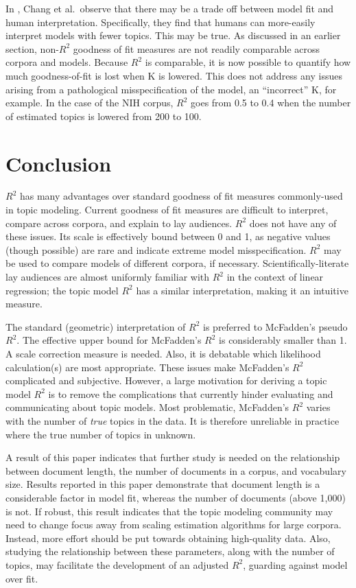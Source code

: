 \documentclass[conference,final,]{IEEEtran}
\begin{document}
In \cite{chang09}, Chang et al.~observe that there may be a trade off
between model fit and human interpretation. Specifically, they find that
humans can more-easily interpret models with fewer topics. This may be
true. As discussed in an earlier section, non-\(R^2\) goodness of fit
measures are not readily comparable across corpora and models. Because
\(R^2\) is comparable, it is now possible to quantify how much
goodness-of-fit is lost when K is lowered. This does not address any
issues arising from a pathological misspecification of the model, an
``incorrect'' K, for example. In the case of the NIH corpus, \(R^2\)
goes from 0.5 to 0.4 when the number of estimated topics is lowered from
200 to 100.

\hypertarget{conclusion}{%
\section{Conclusion}\label{conclusion}}

\(R^2\) has many advantages over standard goodness of fit measures
commonly-used in topic modeling. Current goodness of fit measures are
difficult to interpret, compare across corpora, and explain to lay
audiences. \(R^2\) does not have any of these issues. Its scale is
effectively bound between 0 and 1, as negative values (though possible)
are rare and indicate extreme model misspecification. \(R^2\) may be
used to compare models of different corpora, if necessary.
Scientifically-literate lay audiences are almost uniformly familiar with
\(R^2\) in the context of linear regression; the topic model \(R^2\) has
a similar interpretation, making it an intuitive measure.

The standard (geometric) interpretation of \(R^2\) is preferred to
McFadden's pseudo \(R^2\). The effective upper bound for McFadden's
\(R^2\) is considerably smaller than 1. A scale correction measure is
needed. Also, it is debatable which likelihood calculation(s) are most
appropriate. These issues make McFadden's \(R^2\) complicated and
subjective. However, a large motivation for deriving a topic model
\(R^2\) is to remove the complications that currently hinder evaluating
and communicating about topic models. Most problematic, McFadden's
\(R^2\) varies with the number of \textit{true} topics in the data. It
is therefore unreliable in practice where the true number of topics in
unknown.

A result of this paper indicates that further study is needed on the
relationship between document length, the number of documents in a
corpus, and vocabulary size. Results reported in this paper demonstrate
that document length is a considerable factor in model fit, whereas the
number of documents (above 1,000) is not. If robust, this result
indicates that the topic modeling community may need to change focus
away from scaling estimation algorithms for large corpora. Instead, more
effort should be put towards obtaining high-quality data. Also, studying
the relationship between these parameters, along with the number of
topics, may facilitate the development of an adjusted \(R^2\), guarding
against model over fit.
\end{document}
